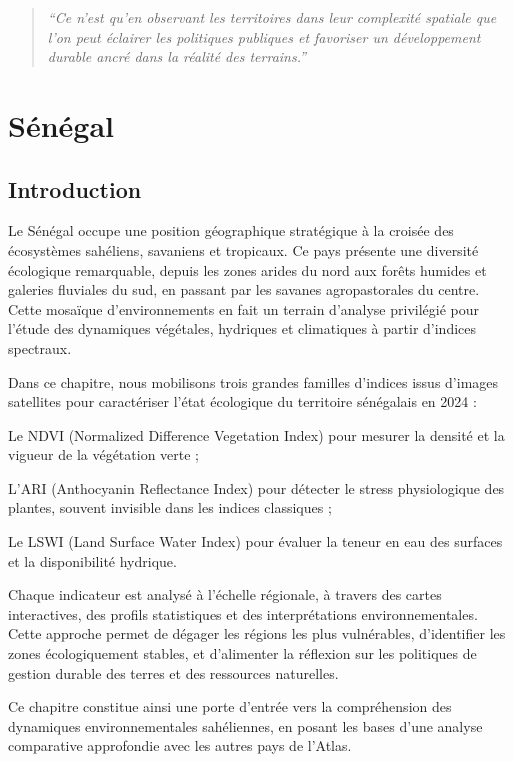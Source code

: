 \documentclass[
]{book}
\begin{document}
\begin{quote}
\emph{``Ce n'est qu'en observant les territoires dans leur complexité spatiale que l'on peut éclairer les politiques publiques et favoriser un développement durable ancré dans la réalité des terrains.''}
\end{quote}

\chapter{Sénégal}\label{suxe9nuxe9gal}

\section{Introduction}\label{introduction}

Le Sénégal occupe une position géographique stratégique à la croisée des écosystèmes sahéliens, savaniens et tropicaux. Ce pays présente une diversité écologique remarquable, depuis les zones arides du nord aux forêts humides et galeries fluviales du sud, en passant par les savanes agropastorales du centre. Cette mosaïque d'environnements en fait un terrain d'analyse privilégié pour l'étude des dynamiques végétales, hydriques et climatiques à partir d'indices spectraux.

Dans ce chapitre, nous mobilisons trois grandes familles d'indices issus d'images satellites pour caractériser l'état écologique du territoire sénégalais en 2024 :

Le NDVI (Normalized Difference Vegetation Index) pour mesurer la densité et la vigueur de la végétation verte ;

L'ARI (Anthocyanin Reflectance Index) pour détecter le stress physiologique des plantes, souvent invisible dans les indices classiques ;

Le LSWI (Land Surface Water Index) pour évaluer la teneur en eau des surfaces et la disponibilité hydrique.

Chaque indicateur est analysé à l'échelle régionale, à travers des cartes interactives, des profils statistiques et des interprétations environnementales. Cette approche permet de dégager les régions les plus vulnérables, d'identifier les zones écologiquement stables, et d'alimenter la réflexion sur les politiques de gestion durable des terres et des ressources naturelles.

Ce chapitre constitue ainsi une porte d'entrée vers la compréhension des dynamiques environnementales sahéliennes, en posant les bases d'une analyse comparative approfondie avec les autres pays de l'Atlas.
\end{document}
